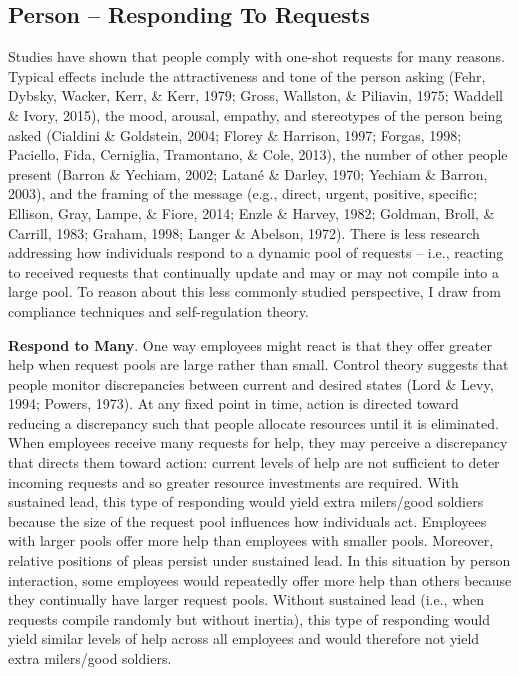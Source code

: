 \documentclass[english,,man]{apa6}
\begin{document}
\hypertarget{person-responding-to-requests}{%
\subsection{Person -- Responding To Requests}\label{person-responding-to-requests}}

Studies have shown that people comply with one-shot requests for many reasons. Typical effects include the attractiveness and tone of the person asking (Fehr, Dybsky, Wacker, Kerr, \& Kerr, 1979; Gross, Wallston, \& Piliavin, 1975; Waddell \& Ivory, 2015), the mood, arousal, empathy, and stereotypes of the person being asked (Cialdini \& Goldstein, 2004; Florey \& Harrison, 1997; Forgas, 1998; Paciello, Fida, Cerniglia, Tramontano, \& Cole, 2013), the number of other people present (Barron \& Yechiam, 2002; Latané \& Darley, 1970; Yechiam \& Barron, 2003), and the framing of the message (e.g., direct, urgent, positive, specific; Ellison, Gray, Lampe, \& Fiore, 2014; Enzle \& Harvey, 1982; Goldman, Broll, \& Carrill, 1983; Graham, 1998; Langer \& Abelson, 1972). There is less research addressing how individuals respond to a dynamic pool of requests -- i.e., reacting to received requests that continually update and may or may not compile into a large pool. To reason about this less commonly studied perspective, I draw from compliance techniques and self-regulation theory.

\textbf{Respond to Many}. One way employees might react is that they offer greater help when request pools are large rather than small. Control theory suggests that people monitor discrepancies between current and desired states (Lord \& Levy, 1994; Powers, 1973). At any fixed point in time, action is directed toward reducing a discrepancy such that people allocate resources until it is eliminated. When employees receive many requests for help, they may perceive a discrepancy that directs them toward action: current levels of help are not sufficient to deter incoming requests and so greater resource investments are required. With sustained lead, this type of responding would yield extra milers/good soldiers because the size of the request pool influences how individuals act. Employees with larger pools offer more help than employees with smaller pools. Moreover, relative positions of pleas persist under sustained lead. In this situation by person interaction, some employees would repeatedly offer more help than others because they continually have larger request pools. Without sustained lead (i.e., when requests compile randomly but without inertia), this type of responding would yield similar levels of help across all employees and would therefore not yield extra milers/good soldiers.
\end{document}
